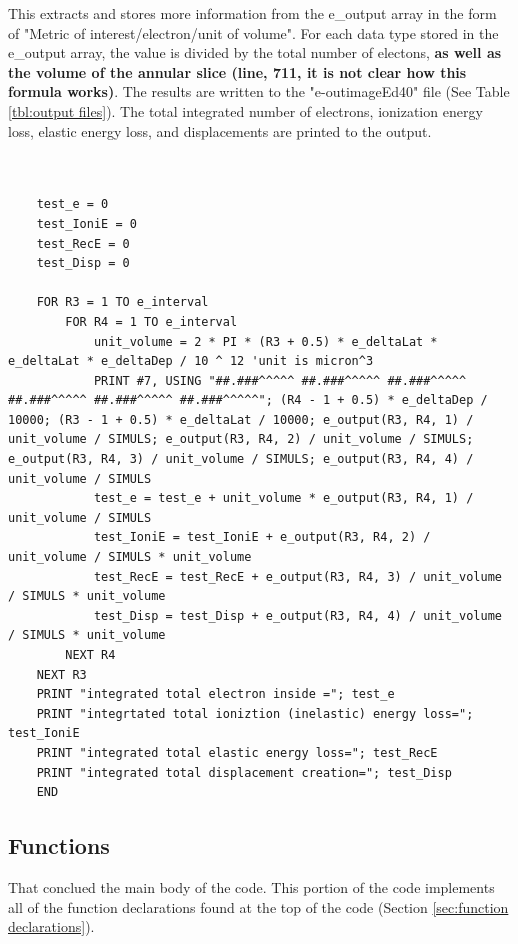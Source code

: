 \documentclass[10pt, reqno]{exam}
\begin{document}
This extracts and stores more information from the e\_output array in the form of "Metric of interest/electron/unit of volume". For each data type stored in the e\_output array, the value is divided by the total number of electons, \textbf{as well as the volume of the annular slice (line, 711, it is not clear how this formula works)}. The results are written to the "e-outimageEd40" file (See Table \ref{tbl:output files}). The total integrated number of electrons, ionization energy loss, elastic energy loss, and displacements are printed to the output.

\begin{verbatim}
    
    
    test_e = 0
    test_IoniE = 0
    test_RecE = 0
    test_Disp = 0
    
    FOR R3 = 1 TO e_interval
        FOR R4 = 1 TO e_interval
            unit_volume = 2 * PI * (R3 + 0.5) * e_deltaLat * e_deltaLat * e_deltaDep / 10 ^ 12 'unit is micron^3
            PRINT #7, USING "##.###^^^^^ ##.###^^^^^ ##.###^^^^^ ##.###^^^^^ ##.###^^^^^ ##.###^^^^^"; (R4 - 1 + 0.5) * e_deltaDep / 10000; (R3 - 1 + 0.5) * e_deltaLat / 10000; e_output(R3, R4, 1) / unit_volume / SIMULS; e_output(R3, R4, 2) / unit_volume / SIMULS; e_output(R3, R4, 3) / unit_volume / SIMULS; e_output(R3, R4, 4) / unit_volume / SIMULS
            test_e = test_e + unit_volume * e_output(R3, R4, 1) / unit_volume / SIMULS
            test_IoniE = test_IoniE + e_output(R3, R4, 2) / unit_volume / SIMULS * unit_volume
            test_RecE = test_RecE + e_output(R3, R4, 3) / unit_volume / SIMULS * unit_volume
            test_Disp = test_Disp + e_output(R3, R4, 4) / unit_volume / SIMULS * unit_volume
        NEXT R4
    NEXT R3
    PRINT "integrated total electron inside ="; test_e
    PRINT "integrtated total ioniztion (inelastic) energy loss="; test_IoniE
    PRINT "integrated total elastic energy loss="; test_RecE
    PRINT "integrated total displacement creation="; test_Disp
    END
\end{verbatim}

\subsection{Functions}

That conclued the main body of the code. This portion of the code implements all of the function declarations found at the top of the code (Section \ref{sec:function declarations}). \par
\end{document}
